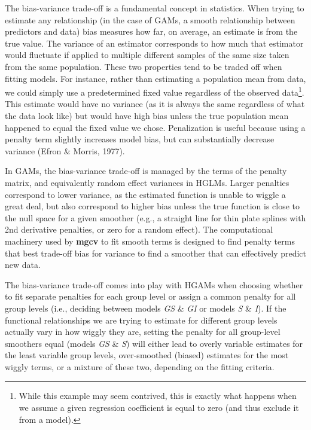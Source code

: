\documentclass[12pt]{article}
\let\rmarkdownfootnote\footnote%
\def\footnote{\protect\rmarkdownfootnote}
\begin{document}
The bias-variance trade-off is a fundamental concept in statistics. When
trying to estimate any relationship (in the case of GAMs, a smooth
relationship between predictors and data) bias measures how far, on
average, an estimate is from the true value. The variance of an
estimator corresponds to how much that estimator would fluctuate if
applied to multiple different samples of the same size taken from the
same population. These two properties tend to be traded off when fitting
models. For instance, rather than estimating a population mean from
data, we could simply use a predetermined fixed value regardless of the
observed data\footnote{While this example may seem contrived, this is
  exactly what happens when we assume a given regression coefficient is
  equal to zero (and thus exclude it from a model).}. This estimate
would have no variance (as it is always the same regardless of what the
data look like) but would have high bias unless the true population mean
happened to equal the fixed value we chose. Penalization is useful
because using a penalty term slightly increases model bias, but can
substantially decrease variance (Efron \& Morris, 1977).

In GAMs, the bias-variance trade-off is managed by the terms of the
penalty matrix, and equivalently random effect variances in HGLMs.
Larger penalties correspond to lower variance, as the estimated function
is unable to wiggle a great deal, but also correspond to higher bias
unless the true function is close to the null space for a given smoother
(e.g., a straight line for thin plate splines with 2nd derivative
penalties, or zero for a random effect). The computational machinery
used by \textbf{mgcv} to fit smooth terms is designed to find penalty
terms that best trade-off bias for variance to find a smoother that can
effectively predict new data.

The bias-variance trade-off comes into play with HGAMs when choosing
whether to fit separate penalties for each group level or assign a
common penalty for all group levels (i.e., deciding between models
\emph{GS} \& \emph{GI} or models \emph{S} \& \emph{I}). If the
functional relationships we are trying to estimate for different group
levels actually vary in how wiggly they are, setting the penalty for all
group-level smoothers equal (models \emph{GS} \& \emph{S}) will either
lead to overly variable estimates for the least variable group levels,
over-smoothed (biased) estimates for the most wiggly terms, or a mixture
of these two, depending on the fitting criteria.
\end{document}
